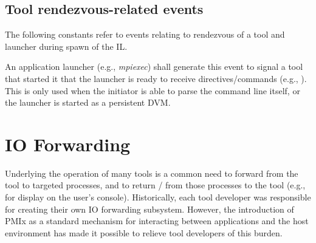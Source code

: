 %
%

\subsection{Tool rendezvous-related events}
\label{api:tools:attributes:spawnconst}

The following constants refer to events relating to rendezvous of a tool and launcher during spawn of the \ac{IL}.

\begin{constantdesc}
%
An application launcher (e.g., \emph{mpiexec}) shall generate this event to signal a tool that started it that the launcher is ready to receive directives/commands (e.g., ). This is only used when the initiator is able to parse the command line itself, or the launcher is started as a persistent \ac{DVM}.
%
\end{constantdesc}

\section{IO Forwarding}
\label{chap:api_tools:iof}

Underlying the operation of many tools is a common need to forward  from the tool to targeted processes, and to return / from those processes to the tool (e.g., for display on the user’s console). Historically, each tool developer was responsible for creating their own \ac{IO} forwarding subsystem. However, the introduction of \ac{PMIx} as a standard mechanism for interacting between applications and the host environment has made it possible to relieve tool developers of this burden.

